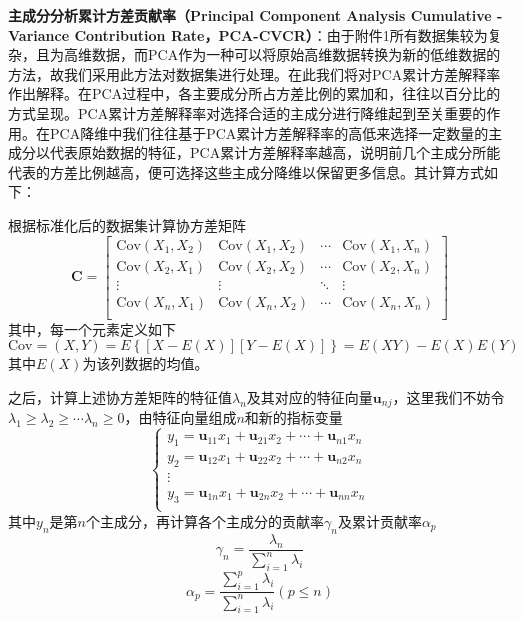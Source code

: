\documentclass{MathorCupModeling}
\begin{document}
	\textbf{主成分分析累计方差贡献率（Principal Component Analysis Cumulative - Variance Contribution Rate，PCA-CVCR）}\label{PCA-CVCR}：由于附件1所有数据集较为复杂，且为高维数据，而PCA作为一种可以将原始高维数据转换为新的低维数据的方法，故我们采用此方法对数据集进行处理。在此我们将对PCA累计方差解释率作出解释。在PCA过程中，各主要成分所占方差比例的累加和，往往以百分比的方式呈现。PCA累计方差解释率对选择合适的主成分进行降维起到至关重要的作用。在PCA降维中我们往往基于PCA累计方差解释率的高低来选择一定数量的主成分以代表原始数据的特征，PCA累计方差解释率越高，说明前几个主成分所能代表的方差比例越高，便可选择这些主成分降维以保留更多信息。其计算方式如下：
	
	根据标准化后的数据集计算协方差矩阵
	\begin{equation}
		\boldsymbol{C}=\left[ \begin{matrix}
			\text{Cov}\left( X_1,X_2 \right)&		\text{Cov}\left( X_1,X_2 \right)&		\cdots&		\text{Cov}\left( X_1,X_n \right)\\
			\text{Cov}\left( X_2,X_1 \right)&		\text{Cov}\left( X_2,X_2 \right)&		\cdots&		\text{Cov}\left( X_2,X_n \right)\\
			\vdots&		\vdots&		\ddots&		\vdots\\
			\text{Cov}\left( X_n,X_1 \right)&		\text{Cov}\left( X_n,X_2 \right)&		\cdots&		\text{Cov}\left( X_n,X_n \right)\\
		\end{matrix} \right] \label{C}
	\end{equation}
	其中，每一个元素定义如下\textcolor{blue}{\cite{Paper:概率论与数理统计}}
	\begin{equation}
		\text{Cov}=\left( X,Y \right)=E\left\{\left[X-E\left(X\right)\right]\left[Y-E\left(X\right)\right]\right\}=E\left(XY\right)-E\left(X\right)E\left(Y\right) \label{Cov}
	\end{equation}
	其中$E\left(X\right)$为该列数据的均值。

	之后，计算上述协方差矩阵的特征值$\lambda_n$及其对应的特征向量$\boldsymbol{u}_{nj}$，这里我们不妨令$\lambda_1\geqslant\lambda_2\geqslant\cdots\lambda_n\geqslant 0$，由特征向量组成$n$和新的指标变量
	\begin{equation}
		\left\{ \begin{array}{l}
			y_1=\boldsymbol{u}_{11}x_1+\boldsymbol{u}_{21}x_2+\cdots +\boldsymbol{u}_{n1}x_n\\
			y_2=\boldsymbol{u}_{12}x_1+\boldsymbol{u}_{22}x_2+\cdots +\boldsymbol{u}_{n2}x_n\\
			\vdots\\
			y_3=\boldsymbol{u}_{1n}x_1+\boldsymbol{u}_{2n}x_2+\cdots +\boldsymbol{u}_{nn}x_n\\
		\end{array} \right. 
	\end{equation}
	其中$y_n$是第$n$个主成分，再计算各个主成分的贡献率$\gamma_n$及累计贡献率$\alpha_p$
	\begin{equation}
		\gamma_n=\frac{\lambda_n}{\sum\limits_{i=1}^n\lambda_i}
	\end{equation}
	\begin{equation}
		\alpha_p=\frac{\sum\limits_{i=1}^p\lambda_i}{\sum\limits_{i=1}^{n}\lambda_i}\left(p\leqslant n\right)
	\end{equation}
	
\end{document}
